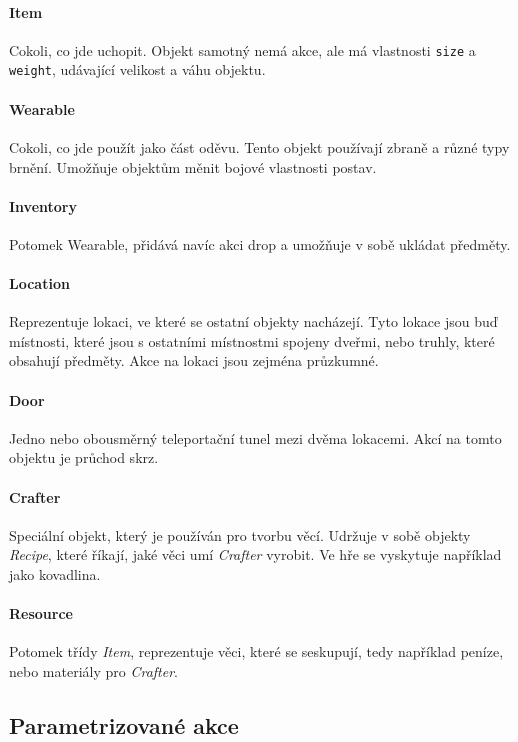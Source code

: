 \documentclass[11pt, a4paper]{article}
\def\class#1{\emph{#1}}
\begin{document}
\paragraph{Item} Cokoli, co jde uchopit. Objekt samotný nemá akce, ale má vlastnosti \texttt{size} a \texttt{weight}, udávající velikost a váhu objektu.

\paragraph{Wearable} Cokoli, co jde použít jako část oděvu. Tento objekt používají zbraně a různé typy brnění. Umožňuje objektům měnit bojové vlastnosti postav.

\paragraph{Inventory} Potomek Wearable, přidává navíc akci drop a umožňuje v sobě ukládat předměty.

\paragraph{Location} Reprezentuje lokaci, ve které se ostatní objekty nacházejí. Tyto lokace jsou buď místnosti, které jsou s ostatními místnostmi spojeny dveřmi, nebo truhly, které obsahují předměty. Akce na lokaci jsou zejména průzkumné. 

\paragraph{Door} Jedno nebo obousměrný teleportační tunel mezi dvěma lokacemi. Akcí na tomto objektu je průchod skrz.

\paragraph{Crafter} Speciální objekt, který je používán pro tvorbu věcí. Udržuje v sobě objekty \class{Recipe}, které říkají, jaké věci umí \class{Crafter} vyrobit. Ve hře se vyskytuje například jako kovadlina.

\paragraph{Resource} Potomek třídy \class{Item}, reprezentuje věci, které se seskupují, tedy například peníze, nebo materiály pro \class{Crafter}.

\subsection{Parametrizované akce}
\end{document}
